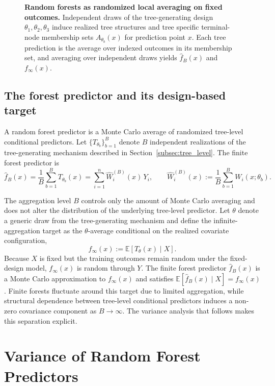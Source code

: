 \documentclass[11pt]{article}
\theoremstyle{plain}
\theoremstyle{definition}
\theoremstyle{remark}
\begin{document}
\begin{figure}[t]
	\caption{\textbf{Random forests as randomized local averaging on fixed outcomes.}
		Independent draws of the tree-generating design $\theta_1,\theta_2,\theta_3$ induce realized tree structures and tree specific terminal-node membership sets $A_{\theta_b}(x)$ for prediction point $x$. Each tree prediction is the average over indexed outcomes in its membership set, and averaging over independent draws yields $\hat f_B(x)$ and $f_\infty(x)$.}
	\label{fig:rf_design_schematic}
\end{figure}

\subsection{The forest predictor and its design-based target}
\label{subsec:forest_estimator}

A random forest predictor is a Monte Carlo average of randomized tree-level conditional predictors. Let $\{T_{\theta_b}\}_{b=1}^B$ denote $B$ independent realizations of the tree-generating mechanism described in Section~\ref{subsec:tree_level}. The finite forest predictor is
\[
\hat f_B(x)
=
\frac{1}{B}\sum_{b=1}^B T_{\theta_b}(x)
=
\sum_{i=1}^n \hat W_i^{(B)}(x)\,Y_i,
\qquad
\hat W_i^{(B)}(x)
:=
\frac{1}{B}\sum_{b=1}^B W_i(x;\theta_b).
\]

The aggregation level $B$ controls only the amount of Monte Carlo averaging and does not alter the distribution of the underlying tree-level predictor. Let $\theta$ denote a generic draw from the tree-generating mechanism and define the infinite-aggregation target as the $\theta$-average conditional on the realized covariate configuration,
\[
f_\infty(x)
:=
\mathbb E\!\left[T_\theta(x)\mid X\right].
\]
Because $X$ is fixed but the training outcomes remain random under the fixed-design model, $f_\infty(x)$ is random through $Y$. The finite forest predictor $\hat f_B(x)$ is a Monte Carlo approximation to $f_\infty(x)$ and satisfies $\mathbb E[\hat f_B(x)\mid X]=f_\infty(x)$. Finite forests fluctuate around this target due to limited aggregation, while structural dependence between tree-level conditional predictors induces a non-zero covariance component as $B\to\infty$. The variance analysis that follows makes this separation explicit.

\section{Variance of Random Forest Predictors}
\label{sec:rf_variance}
\end{document}
